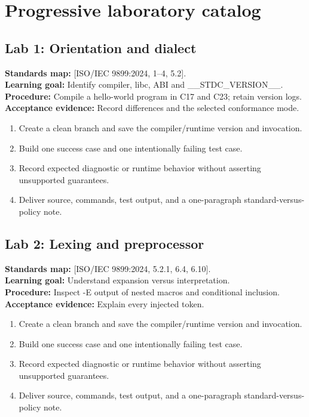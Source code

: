 \documentclass[10pt,letterpaper,oneside]{report}
\newcommand{\refcl}[1]{\textsf{\footnotesize[ISO/IEC 9899:2024, #1]}}
\begin{document}
\chapter{Progressive laboratory catalog}
\section{Lab 1: Orientation and dialect}
\textbf{Standards map:} \refcl{1--4, 5.2}.\\
\textbf{Learning goal:} Identify compiler, libc, ABI and \_\_STDC\_VERSION\_\_.\\
\textbf{Procedure:} Compile a hello-world program in C17 and C23; retain version logs.\\
\textbf{Acceptance evidence:} Record differences and the selected conformance mode.
\begin{enumerate}
\item Create a clean branch and save the compiler/runtime version and invocation.
\item Build one success case and one intentionally failing test case.
\item Record expected diagnostic or runtime behavior without asserting unsupported guarantees.
\item Deliver source, commands, test output, and a one-paragraph standard-versus-policy note.
\end{enumerate}

\section{Lab 2: Lexing and preprocessor}
\textbf{Standards map:} \refcl{5.2.1, 6.4, 6.10}.\\
\textbf{Learning goal:} Understand expansion versus interpretation.\\
\textbf{Procedure:} Inspect -E output of nested macros and conditional inclusion.\\
\textbf{Acceptance evidence:} Explain every injected token.
\begin{enumerate}
\item Create a clean branch and save the compiler/runtime version and invocation.
\item Build one success case and one intentionally failing test case.
\item Record expected diagnostic or runtime behavior without asserting unsupported guarantees.
\item Deliver source, commands, test output, and a one-paragraph standard-versus-policy note.
\end{enumerate}
\end{document}
